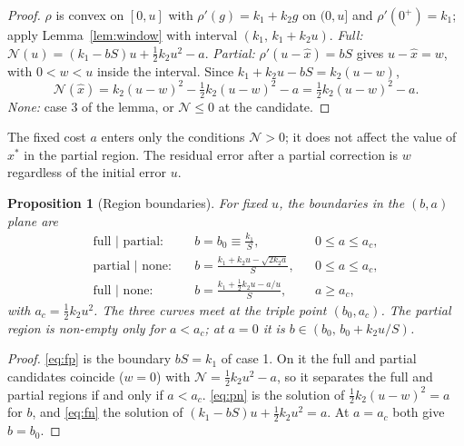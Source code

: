 \documentclass[11pt,a4paper]{article}
\newtheorem{proposition}{Proposition}
\theoremstyle{remark}
\newcommand{\NB}{\mathcal{N}}
\begin{document}
\begin{proof}
$\rho$ is convex on $[0,u]$ with $\rho'(g) = k_1 + k_2g$ on $(0,u]$ and $\rho'(0^+) = k_1$;
apply Lemma~\ref{lem:window} with interval $(k_1,\,k_1+k_2u)$.
\emph{Full:} $\NB(u) = (k_1 - bS)u + \tfrac12k_2u^2 - a$.
\emph{Partial:} $\rho'(u-\hat x) = bS$ gives $u - \hat x = w$, with $0<w<u$ inside the
interval. Since $k_1 + k_2u - bS = k_2(u - w)$,
\[
  \NB(\hat x) = k_2(u-w)^2 - \tfrac12k_2(u-w)^2 - a = \tfrac12k_2(u-w)^2 - a .
\]
\emph{None:} case 3 of the lemma, or $\NB\le 0$ at the candidate.
\end{proof}

The fixed cost $a$ enters only the conditions $\NB>0$; it does not affect the value of
$x^*$ in the partial region. The residual error after a partial correction is $w$
regardless of the initial error $u$.

\begin{proposition}[Region boundaries]\label{prop:boundaries}
For fixed $u$, the boundaries in the $(b,a)$ plane are
\begin{align}
  \text{full | partial:} &\quad b = b_0 \equiv \frac{k_1}{S}, && 0\le a\le a_c,
    \label{eq:fp}\\
  \text{partial | none:} &\quad b = \frac{k_1 + k_2u - \sqrt{2k_2a}}{S}, && 0\le a\le a_c,
    \label{eq:pn}\\
  \text{full | none:}    &\quad b = \frac{k_1 + \tfrac12k_2u - a/u}{S}, && a\ge a_c,
    \label{eq:fn}
\end{align}
with $a_c = \tfrac12k_2u^2$. The three curves meet at the triple point $(b_0, a_c)$. The
partial region is non-empty only for $a < a_c$; at $a = 0$ it is
$b\in(b_0,\, b_0 + k_2u/S)$.
\end{proposition}

\begin{proof}
\eqref{eq:fp} is the boundary $bS = k_1$ of case 1. On it the full and partial candidates
coincide ($w = 0$) with $\NB = \tfrac12k_2u^2 - a$, so it separates the full and partial
regions if and only if $a < a_c$. \eqref{eq:pn} is the solution of $\tfrac12k_2(u-w)^2 = a$
for $b$, and \eqref{eq:fn} the solution of $(k_1 - bS)u + \tfrac12k_2u^2 = a$. At $a = a_c$
both give $b = b_0$.
\end{proof}
\end{document}
